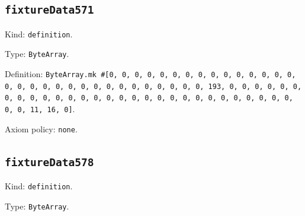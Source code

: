 \documentclass[11pt]{article}
\begin{document}
\subsection*{\texttt{fixtureData571}}
\noindent Kind: \texttt{definition}.\par
\noindent Type: \texttt{ByteArray}.\par
\noindent Definition: \texttt{ByteArray.mk \#[0, 0, 0, 0, 0, 0, 0, 0, 0, 0, 0, 0, 0, 0, 0, 0, 0, 0, 0, 0, 0, 0, 0, 0, 0, 0, 0, 0, 0, 0, 0, 193, 0, 0, 0, 0, 0, 0, 0, 0, 0, 0, 0, 0, 0, 0, 0, 0, 0, 0, 0, 0, 0, 0, 0, 0, 0, 0, 0, 0, 0, 0, 0, 11, 16, 0]}.\par
\noindent Axiom policy: \texttt{none}.\par
\subsection*{\texttt{fixtureData578}}
\noindent Kind: \texttt{definition}.\par
\noindent Type: \texttt{ByteArray}.\par
\end{document}
